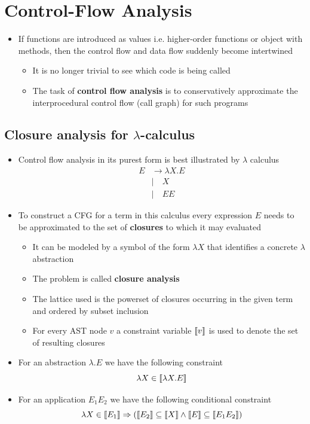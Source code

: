 \section{Control-Flow Analysis}
\begin{itemize}
  \item If functions are introduced as values i.e. higher-order functions or object with methods, then the control flow and data flow suddenly become intertwined
  \begin{itemize}
  	\item It is no longer trivial to see which code is being called
  	\item The task of \textbf{control flow analysis} is to conservatively approximate the interprocedural control flow (call graph) for such programs
  \end{itemize}
\end{itemize}
\subsection{Closure analysis for $\lambda$-calculus}
\begin{itemize}
  \item Control flow analysis in its purest form is best illustrated by $\lambda$ calculus
  \begin{align*}
    E &\to \lambda X.E \\
    & \mid \quad X \\
    & \mid \quad E E
  \end{align*} 
  \item To construct a CFG for a term in this calculus every expression $E$ needs to be approximated to the set of \textbf{closures} to which it may evaluated
  \begin{itemize}
  	\item It can be modeled by a symbol of the form $\lambda X$ that identifies a concrete $\lambda$ abstraction
  	\item The problem is called \textbf{closure analysis}
  	\item The lattice used is the powerset of closures occurring in the given term and ordered by subset inclusion
  	\item For every AST node $v$ a constraint variable $\left\llbracket v\right\rrbracket$ is used to denote the set of resulting closures
  \end{itemize}
  \item For an abstraction $\lambda.E$ we have the following constraint
  \begin{equation*}
    \lambda X \in \left\llbracket\lambda X.E\right\rrbracket
  \end{equation*}
  \item For an application $E_1E_2$ we have the following conditional constraint
  \begin{equation*}
    \lambda X \in \left\llbracket E_1\right\rrbracket \Rightarrow (\left\llbracket E_2\right\rrbracket \subseteq \left\llbracket X\right\rrbracket \land \left\llbracket E\right\rrbracket \subseteq \left\llbracket E_1E_2\right\rrbracket) 
  \end{equation*}
\end{itemize}


